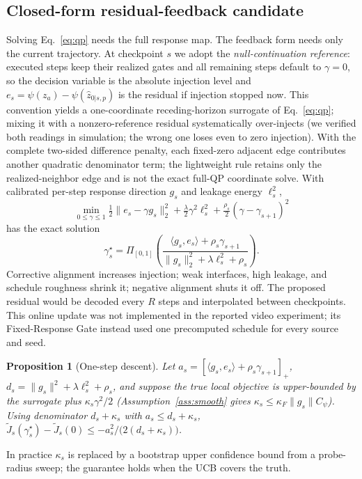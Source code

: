 \documentclass[letterpaper]{article}
\newcommand{\proj}{\Pi_{[0,1]}}
\newtheorem{proposition}{Proposition}
\begin{document}
\subsection{Closed-form residual-feedback candidate}
Solving Eq.~\eqref{eq:qp} needs the full response map. The feedback form
needs only the current trajectory. At checkpoint $s$ we adopt the
\emph{null-continuation reference}: executed steps keep their realized
gates and all remaining steps default to $\gamma{=}0$, so the decision
variable is the absolute injection level and
$e_s=\psi(z_a)-\psi(\hat z_{0|s,p})$ is the residual if injection stopped
now. This convention yields a one-coordinate receding-horizon surrogate of
Eq.~\eqref{eq:qp}; mixing it with a nonzero-reference residual systematically
over-injects (we verified both readings in simulation; the wrong one loses
even to zero injection). With the complete two-sided difference penalty,
each fixed-zero adjacent edge contributes another quadratic denominator
term; the lightweight rule retains only the realized-neighbor edge and is
not the exact full-QP coordinate solve.
With calibrated per-step response direction $g_s$ and leakage energy
$\ell_s^2$,
\begin{equation}
\min_{0\le\gamma\le1}
\tfrac12\|e_s-\gamma g_s\|_2^2
+\tfrac{\lambda}{2}\gamma^2\ell_s^2
+\tfrac{\rho_s}{2}(\gamma-\gamma_{s+1})^2
\label{eq:local}
\end{equation}
has the exact solution
\begin{equation}
\gamma_s^{\star}=\proj\!\left(
\frac{\langle g_s,e_s\rangle+\rho_s\gamma_{s+1}}
{\|g_s\|_2^2+\lambda\ell_s^2+\rho_s}
\right).
\label{eq:gate}
\end{equation}
Corrective alignment increases injection; weak interfaces, high leakage,
and schedule roughness shrink it; negative alignment shuts it off. The
proposed residual would be decoded every $R$ steps and interpolated between
checkpoints. This online update was not implemented in the reported video
experiment; its Fixed-Response Gate instead used one precomputed schedule
for every source and seed.
\begin{proposition}[One-step descent]\label{prop:descent}
Let $a_s=[\langle g_s,e_s\rangle+\rho_s\gamma_{s+1}]_+$,
$d_s=\|g_s\|^2+\lambda\ell_s^2+\rho_s$, and suppose the true local
objective is upper-bounded by the surrogate plus $\kappa_s\gamma^2/2$
(Assumption~\ref{ass:smooth} gives
$\kappa_s\le\kappa_F\|g_s\|C_\psi$). Using denominator $d_s+\kappa_s$
with $a_s\le d_s+\kappa_s$,
$\tilde J_s(\gamma_s^\star)-\tilde J_s(0)\le -a_s^2/\bigl(2(d_s+\kappa_s)\bigr)$.
\end{proposition}
In practice $\kappa_s$ is replaced by a bootstrap upper confidence bound
from a probe-radius sweep; the guarantee holds when the UCB covers the
truth.
\end{document}
